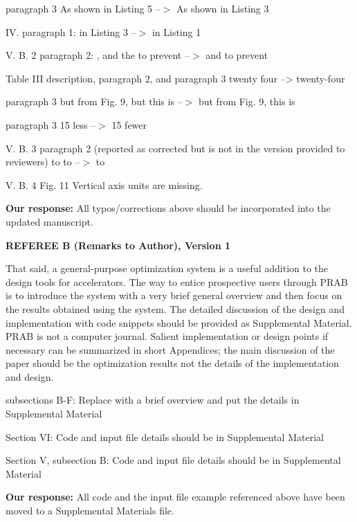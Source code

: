 \documentclass{article}
\begin{document}
paragraph 3
As shown in Listing 5 --$>$ As shown in Listing 3

IV. paragraph 1:
in Listing 3 --$>$ in Listing 1

V. B. 2 paragraph 2:
, and the to prevent --$>$ and to prevent

Table III description, paragraph 2, and paragraph 3
twenty four --> twenty-four

paragraph 3
but from Fig. 9, but this is --$>$ but from Fig. 9, this is

paragraph 3
15 less --$>$ 15 fewer

V. B. 3
paragraph 2 (reported as corrected but is not in the version provided
to reviewers)
to to --$>$ to

V. B. 4
Fig. 11 Vertical axis units are missing.

{\bf Our response:} {\color{blue} All typos/corrections above should be incorporated into the updated manuscript.}



{\bf REFEREE B (Remarks to Author), Version 1}

\vspace{1em}
That said, a general-purpose optimization system is a useful addition
to the design tools for accelerators. The way to entice prospective
users through PRAB is to introduce the system with a very brief
general overview and then focus on the results obtained using the
system. The detailed discussion of the design and implementation with
code snippets should be provided as Supplemental Material. PRAB is not
a computer journal. Salient implementation or design points if
necessary can be summarized in short Appendices; the main discussion
of the paper should be the optimization results not the details of the
implementation and design. 

subsections B-F:
Replace with a brief overview and put the details in Supplemental
Material

Section VI: 
Code and input file details should be in Supplemental Material

Section V, subsection B:
Code and input file details should be in Supplemental Material

{\bf Our response: } {\color{blue} All code and the input file example referenced above have been moved 
					to a Supplemental Materials file.}



 
\end{document}
